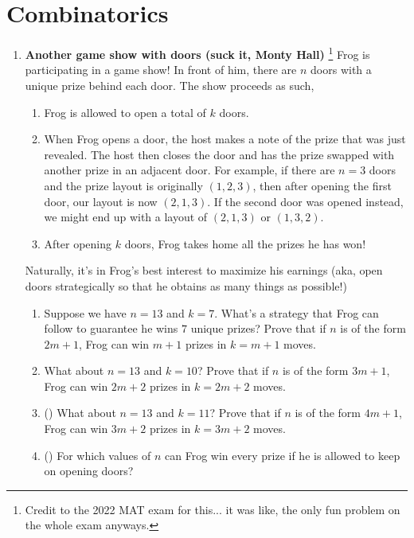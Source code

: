 \documentclass[11pt]{scrartcl}
\begin{document}
\section{Combinatorics}
\begin{enumerate}[label=\textbf{C\arabic*}.]
    \item \textbf{Another game show with doors (suck it, Monty Hall)} \footnote{Credit to the 2022 MAT exam for this... it was like, the only fun problem on the whole exam anyways.} \newline
    Frog is participating in a game show! In front of him, there are $n$ doors with a unique prize behind each door. The show proceeds as such,
    
    \begin{enumerate}[label=\arabic*.]
        \item Frog is allowed to open a total of $k$ doors.
        
        \item When Frog opens a door, the host makes a note of the prize that was just revealed. The host then closes the door and has the prize swapped with another prize in an adjacent door. For example, if there are $n = 3$ doors and the prize layout is originally $(1, 2, 3)$, then after opening the first door, our layout is now $(2, 1, 3)$. If the second door was opened instead, we might end up with a layout of $(2, 1, 3)$ or $(1, 3, 2)$.
        
        \item After opening $k$ doors, Frog takes home all the prizes he has won!
    \end{enumerate}
    
    Naturally, it's in Frog's best interest to maximize his earnings (aka, open doors strategically so that he obtains as many things as possible!)
    
    \begin{enumerate}
        \item Suppose we have $n = 13$ and $k = 7$. What's a strategy that Frog can follow to guarantee he wins $7$ unique prizes? Prove that if $n$ is of the form $2m + 1$, Frog can win $m + 1$ prizes in $k = m + 1$ moves.
        
        \item What about $n = 13$ and $k = 10$? Prove that if $n$ is of the form $3m + 1$, Frog can win $2m + 2$ prizes in $k = 2m + 2$ moves.
        
        \item (\halfchili) What about $n = 13$ and $k = 11$? Prove that if $n$ is of the form $4m + 1$, Frog can win $3m + 2$ prizes in $k = 3m + 2$ moves.
        
        \item (\fullchili) For which values of $n$ can Frog win every prize if he is allowed to keep on opening doors?
    \end{enumerate}
    
\end{enumerate}
\end{document}
